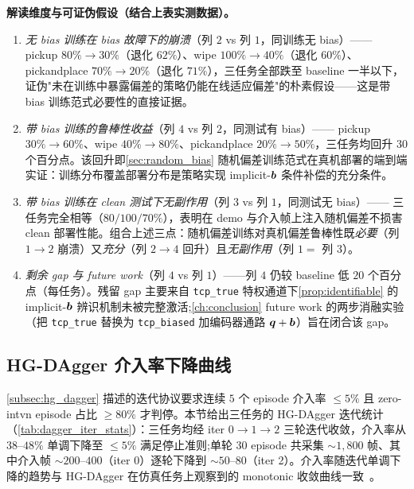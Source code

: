 \textbf{解读维度与可证伪假设（结合上表实测数据）。}
\begin{enumerate}
  \item \emph{无 bias 训练在 bias 故障下的崩溃}（列 $2$ vs 列 $1$，同训练无 bias）—— pickup $80\%\to 30\%$（退化 $62\%$）、wipe $100\%\to 40\%$（退化 $60\%$）、pickandplace $70\%\to 20\%$（退化 $71\%$），三任务全部跌至 baseline 一半以下，证伪"未在训练中暴露偏差的策略仍能在线适应偏差"的朴素假设——这是带 bias 训练范式必要性的直接证据。
  \item \emph{带 bias 训练的鲁棒性收益}（列 $4$ vs 列 $2$，同测试有 bias）—— pickup $30\%\to 60\%$、wipe $40\%\to 80\%$、pickandplace $20\%\to 50\%$，三任务均回升 $30$ 个百分点。该回升即\cref{sec:random_bias} 随机偏差训练范式在真机部署的端到端实证：训练分布覆盖部署分布是策略实现 implicit-$\bm{b}$ 条件补偿的充分条件。
  \item \emph{带 bias 训练在 clean 测试下无副作用}（列 $3$ vs 列 $1$，同测试无 bias）—— 三任务完全相等（$80/100/70\%$），表明在 demo 与介入帧上注入随机偏差不损害 clean 部署性能。组合上述三点：随机偏差训练对真机偏差鲁棒性既\emph{必要}（列 $1\to 2$ 崩溃）又\emph{充分}（列 $2\to 4$ 回升）且\emph{无副作用}（列 $1=$ 列 $3$）。
  \item \emph{剩余 gap 与 future work}（列 $4$ vs 列 $1$）——列 $4$ 仍较 baseline 低 $20$ 个百分点（每任务）。残留 gap 主要来自 \texttt{tcp\_true} 特权通道下\cref{prop:identifiable} 的 implicit-$\bm{b}$ 辨识机制未被完整激活;\cref{ch:conclusion} future work 的两步消融实验（把 \texttt{tcp\_true} 替换为 \texttt{tcp\_biased} 加编码器通路 $\bm{q}+\bm{b}$）旨在闭合该 gap。
\end{enumerate}

\subsection{HG-DAgger 介入率下降曲线}\label{subsec:exp_dagger_curve}

\cref{subsec:hg_dagger} 描述的迭代协议要求连续 $5$ 个 episode 介入率 $\le 5\%$ 且 zero-intvn episode 占比 $\ge 80\%$ 才判停。本节给出三任务的 HG-DAgger 迭代统计（\cref{tab:dagger_iter_stats}）：三任务均经 iter $0\to 1\to 2$ 三轮迭代收敛，介入率从 $38$–$48\%$ 单调下降至 $\le 5\%$ 满足停止准则;单轮 $30$ episode 共采集 $\sim 1{,}800$ 帧、其中介入帧 $\sim 200$–$400$（iter 0）逐轮下降到 $\sim 50$–$80$（iter 2）。介入率随迭代单调下降的趋势与 HG-DAgger 在仿真任务上观察到的 monotonic 收敛曲线一致~\cite{kelly2019hgdagger}。

